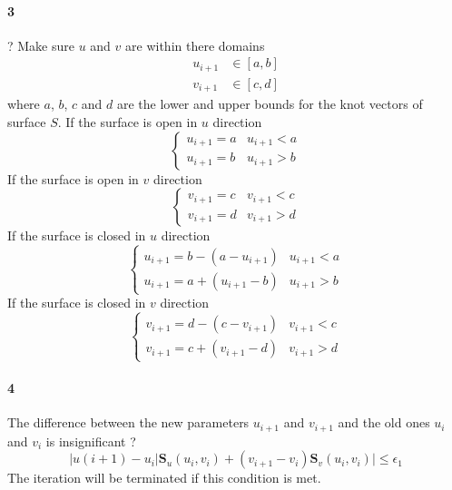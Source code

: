 \paragraph{3} ?
Make sure $u$ and $v$ are within there domains
\begin{align*}
    u_{i+1} & \in [a,b] \\
    v_{i+1} & \in [c,d]
\end{align*}
%
where $a$, $b$, $c$ and $d$ are the lower and upper bounds for the knot vectors of surface $S$.
If the surface is open in $u$ direction
\begin{equation}
    \left\{
        \begin{array}{rl}
            u_{i+1} = a & u_{i+1} < a \\
            u_{i+1} = b & u_{i+1} > b
        \end{array}
    \right.
\end{equation}
%
If the surface is open in $v$ direction
\begin{equation}
    \left\{
        \begin{array}{rl}
            v_{i+1} = c & v_{i+1} < c \\
            v_{i+1} = d & v_{i+1} > d
        \end{array}
    \right.
\end{equation}
%
If the surface is closed in $u$ direction
\begin{equation}
    \left\{
        \begin{array}{rl}
            u_{i+1} = b - ( a - u_{i+1} ) & u_{i+1} < a \\
            u_{i+1} = a + ( u_{i+1} - b ) & u_{i+1} > b
        \end{array}
    \right.
\end{equation}
%
If the surface is closed in $v$ direction
\begin{equation}
    \left\{
        \begin{array}{rl}
            v_{i+1} = d - ( c - v_{i+1} ) & v_{i+1} < c \\
            v_{i+1} = c + ( v_{i+1} - d ) & v_{i+1} > d
        \end{array}
    \right.
\end{equation}
%
\paragraph{4}
The difference between the new parameters $u_{i+1}$ and $v_{i+1}$ and the old ones $u_i$ and $v_i$ is insignificant ?
\begin{equation*}
    |u(i+1) - u_i| \mathbf{S}_u (u_i, v_i) +
    (v_{i+1} - v_i) \mathbf{S}_v (u_i, v_i) |
    \leq \epsilon_1
\end{equation*}
The iteration will be terminated if this condition is met.